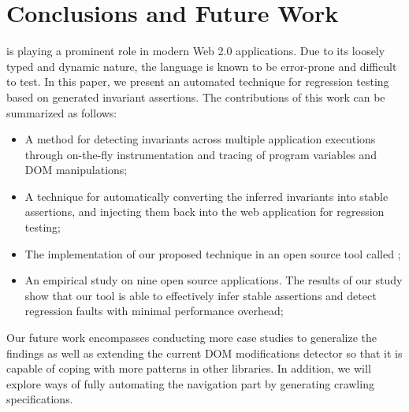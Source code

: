 \section{Conclusions and Future Work}
\label{Sec:conclusion}
\javascript is playing a prominent role in modern Web 2.0 applications. Due to its loosely typed and dynamic nature, the language is known to be error-prone and difficult to test.
In this paper, we present an automated technique for \javascript regression testing based on 
generated invariant assertions. The contributions of this work can be summarized as follows:
\begin{itemize}
\item A method for detecting \javascript invariants across multiple application executions
through on-the-fly \javascript instrumentation and tracing of program variables and DOM manipulations;
\item A technique for automatically converting the inferred invariants into stable assertions,
and injecting them back into the web application for regression testing;
\item The implementation of our proposed technique in an open source
tool called \jsart;
\item An empirical study on nine open source \javascript applications. The results of our study show that our tool is able to effectively infer stable assertions and 
detect regression faults with minimal performance overhead;
\end{itemize}

Our future work encompasses conducting more case studies to generalize the findings as well as extending the current \javascript DOM modifications detector so that it is capable of coping with more patterns in other \javascript libraries. In addition, we will explore ways of fully automating the navigation part by generating crawling specifications.
